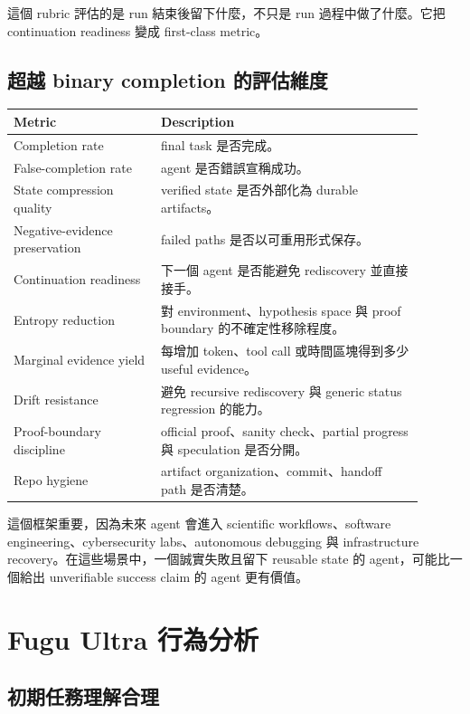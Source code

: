 \documentclass[UTF8,a4paper,11pt]{ctexart}
\begin{document}
這個 rubric 評估的是 run 結束後留下什麼，不只是 run 過程中做了什麼。它把 continuation readiness 變成 first-class metric。

\subsection{超越 binary completion 的評估維度}

\begin{longtable}{L{0.32\linewidth} L{0.58\linewidth}}
\toprule
Metric & Description\\
\midrule
Completion rate & final task 是否完成。\\
False-completion rate & agent 是否錯誤宣稱成功。\\
State compression quality & verified state 是否外部化為 durable artifacts。\\
Negative-evidence preservation & failed paths 是否以可重用形式保存。\\
Continuation readiness & 下一個 agent 是否能避免 rediscovery 並直接接手。\\
Entropy reduction & 對 environment、hypothesis space 與 proof boundary 的不確定性移除程度。\\
Marginal evidence yield & 每增加 token、tool call 或時間區塊得到多少 useful evidence。\\
Drift resistance & 避免 recursive rediscovery 與 generic status regression 的能力。\\
Proof-boundary discipline & official proof、sanity check、partial progress 與 speculation 是否分開。\\
Repo hygiene & artifact organization、commit、handoff path 是否清楚。\\
\bottomrule
\end{longtable}

這個框架重要，因為未來 agent 會進入 scientific workflows、software engineering、cybersecurity labs、autonomous debugging 與 infrastructure recovery。在這些場景中，一個誠實失敗且留下 reusable state 的 agent，可能比一個給出 unverifiable success claim 的 agent 更有價值。

\section{Fugu Ultra 行為分析}

\subsection{初期任務理解合理}
\end{document}

